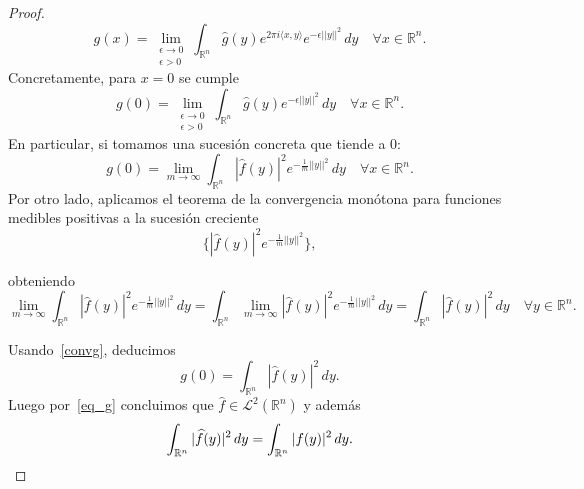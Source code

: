 \begin{proof}
\begin{equation}
    g(x) = \lim_{\substack{\epsilon \rightarrow 0 \\ \epsilon > 0}}  \int_{\mathbb{R}^n} \widehat{g}(y)e^{2\pi i \langle x, y \rangle}  e^{-\epsilon ||y||^2} \, dy  \quad \forall x \in \mathbb{R}^n.
\end{equation}
Concretamente, para $x = 0$ se cumple 
\begin{equation}
    g(0) = \lim_{\substack{\epsilon \rightarrow 0 \\ \epsilon > 0}} \int_{\mathbb{R}^n} \widehat{g}(y)  e^{-\epsilon ||y||^2} \, dy  \quad \forall x \in \mathbb{R}^n.
\end{equation}
En particular, si tomamos una sucesión concreta que tiende a $0$:
\begin{equation}\label{convg}
        g(0) = \lim_{m \to \infty} \int_{\mathbb{R}^n} |\widehat{f}(y)|^2  e^{-\frac{1}{m} ||y||^2} \, dy  \quad \forall x \in \mathbb{R}^n.
\end{equation}
Por otro lado, aplicamos el teorema de la convergencia monótona para funciones medibles positivas a la sucesión creciente
\begin{equation}
    \{|\widehat{f}(y)|^2e^{-\frac{1}{m} ||y||^2}\},
\end{equation}

\noindent obteniendo  
\begin{equation}
    \lim_{m \to \infty} \int_{\mathbb{R}^n} |\widehat{f}(y)|^2  e^{-\frac{1}{m} ||y||^2} \, dy =   \int_{\mathbb{R}^n} \lim_{m \to \infty} |\widehat{f}(y)|^2  e^{-\frac{1}{m} ||y||^2} \, dy = \int_{\mathbb{R}^n} |\widehat{f}(y)|^2   \, dy \quad \forall y \in \mathbb{R}^n.
\end{equation}

\noindent Usando~\eqref{convg}, deducimos 
\begin{equation}
    g(0) = \int_{\mathbb{R}^n} |\widehat{f}(y)|^2   \, dy .
\end{equation}
Luego por~\eqref{eq_g} concluimos que $\widehat{f} \in \mathscr{L}^2(\mathbb{R}^n)$ y además
\begin{equation*}
    \int_{\mathbb{R}^n} |\widehat{f}(y)|^2   \, dy = \int_{\mathbb{R}^n} |f(y)|^2 \, dy. \qedhere
\end{equation*}
\end{proof}

